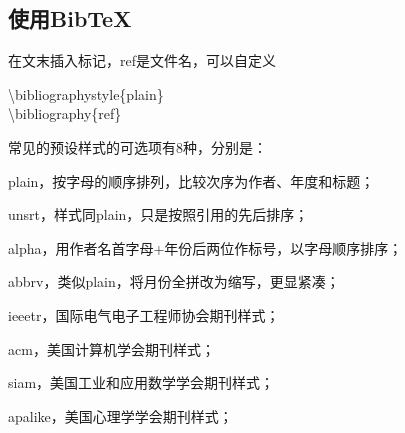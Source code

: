 \documentclass{article}
\begin{document}
	\subsection{使用BibTeX}
	在文末插入标记，ref是文件名，可以自定义\cite{lgz}
	
	\noindent\textbackslash bibliographystyle\{plain\}\\
	\textbackslash bibliography\{ref\} 
	
	常见的预设样式的可选项有8种，分别是：
	
	plain，按字母的顺序排列，比较次序为作者、年度和标题；
	
	unsrt，样式同plain，只是按照引用的先后排序；
	
	alpha，用作者名首字母+年份后两位作标号，以字母顺序排序；
	
	abbrv，类似plain，将月份全拼改为缩写，更显紧凑；
	
	ieeetr，国际电气电子工程师协会期刊样式；
	
	acm，美国计算机学会期刊样式；
	
	siam，美国工业和应用数学学会期刊样式；
	
	apalike，美国心理学学会期刊样式；
	


\end{document}
